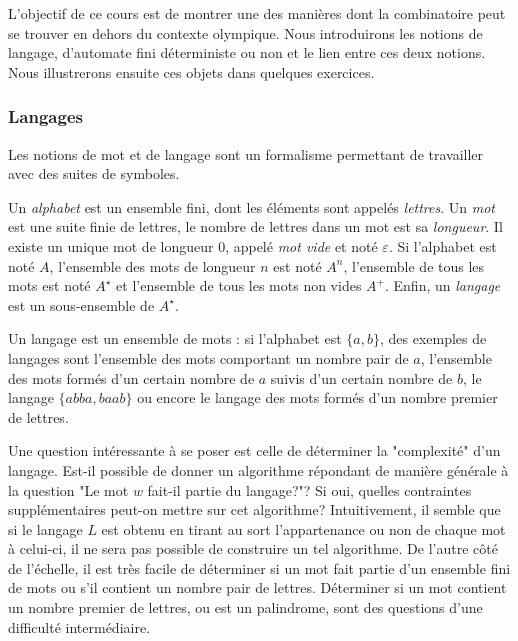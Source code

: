 L'objectif de ce cours est de montrer une des manières dont la combinatoire peut se trouver en dehors du contexte olympique. Nous introduirons les notions de langage, d'automate fini déterministe ou non et le lien entre ces deux notions. Nous illustrerons ensuite ces objets dans quelques exercices.

\subsubsection{Langages}
Les notions de mot et de langage sont un formalisme permettant de travailler avec des suites de symboles.

\begin{dfn}
Un \emph{alphabet} est un ensemble fini, dont les éléments sont appelés \emph{lettres}. Un \emph{mot} est une suite finie de lettres, le nombre de lettres dans un mot est sa \emph{longueur}. Il existe un unique mot de longueur 0, appelé \emph{mot vide} et noté $\varepsilon$. Si l'alphabet est noté $A$, l'ensemble des mots de longueur $n$ est noté $A^n$, l'ensemble de tous les mots est noté $A^\star$ et l'ensemble de tous les mots non vides $A^+$. Enfin, un \emph{langage} est un sous-ensemble de $A^\star$.
\end{dfn}

Un langage est un ensemble de mots : si l'alphabet est $\{a,b\}$, des exemples de langages sont l'ensemble des mots comportant un nombre pair de $a$, l'ensemble des mots formés d'un certain nombre de $a$ suivis d'un certain nombre de $b$, le langage $\{abba,baab\}$ ou encore le langage des mots formés d'un nombre premier de lettres.

Une question intéressante à se poser est celle de déterminer la "complexité" d'un langage. Est-il possible de donner un algorithme répondant de manière générale à la question "Le mot $w$ fait-il partie du langage?"? Si oui, quelles contraintes supplémentaires peut-on mettre sur cet algorithme? Intuitivement, il semble que si le langage $L$ est obtenu en tirant au sort l'appartenance ou non de chaque mot à celui-ci, il ne sera pas possible de construire un tel algorithme. De l'autre côté de l'échelle, il est très facile de déterminer si un mot fait partie d'un ensemble fini de mots ou s'il contient un nombre pair de lettres. Déterminer si un mot contient un nombre premier de lettres, ou est un palindrome, sont des questions d'une difficulté intermédiaire.

